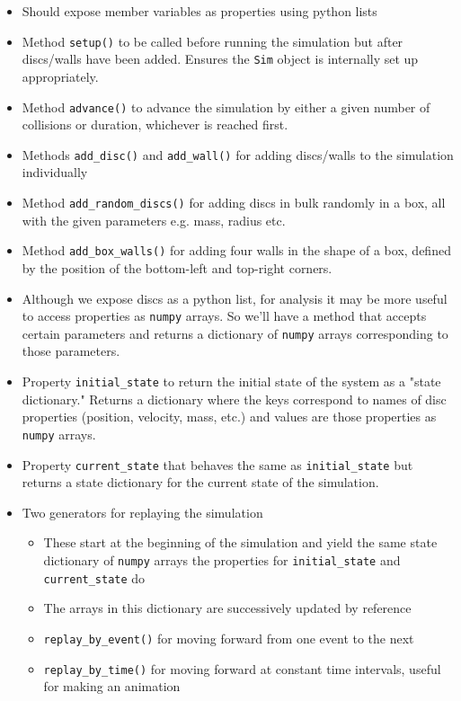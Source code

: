 \documentclass{article}
\begin{document}
\begin{itemize}
    \begin{itemize}
        \item Should expose member variables as properties using python lists
        \item Method \texttt{setup()} to be called before running the simulation but after discs/walls have been added. Ensures the \texttt{Sim} object is internally set up appropriately.
        \item Method \texttt{advance()} to advance the simulation by either a given number of collisions or duration, whichever is reached first.
        \item Methods \texttt{add\_disc()} and \texttt{add\_wall()} for adding discs/walls to the simulation individually
        \item Method \texttt{add\_random\_discs()} for adding discs in bulk randomly in a box, all with the given parameters e.g. mass, radius etc.
        \item Method \texttt{add\_box\_walls()} for adding four walls in the shape of a box, defined by the position of the bottom-left and top-right corners.
        \item Although we expose discs as a python list, for analysis it may be more useful to access properties as \texttt{numpy} arrays. So we'll have a method that accepts certain parameters and returns a dictionary of \texttt{numpy} arrays corresponding to those parameters.
        \item Property \texttt{initial\_state} to return the initial state of the system as a "state dictionary." Returns a dictionary where the keys correspond to names of disc properties (position, velocity, mass, etc.) and values are those properties as \texttt{numpy} arrays.
        \item Property \texttt{current\_state} that behaves the same as \texttt{initial\_state} but returns a state dictionary for the current state of the simulation.
        \item Two generators for replaying the simulation
        \begin{itemize}
            \item These start at the beginning of the simulation and yield the same state dictionary of \texttt{numpy} arrays the properties for \texttt{initial\_state} and \texttt{current\_state} do
            \item The arrays in this dictionary are successively updated by reference
            \item \texttt{replay\_by\_event()} for moving forward from one event to the next
            \item \texttt{replay\_by\_time()} for moving forward at constant time intervals, useful for making an animation
        \end{itemize}
    \end{itemize}
\end{itemize}
\end{document}
